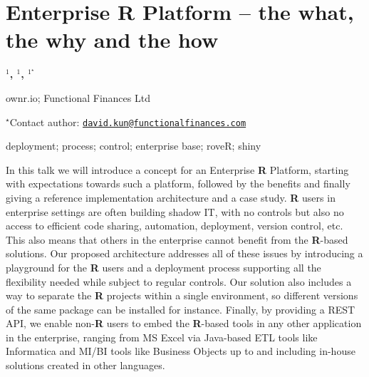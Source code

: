 \documentclass[\main/boa.tex]{subfiles}
\begin{document}
\section{Enterprise R Platform -- the what, the why and the how}

\begin{center}
  {\bf {}$^{1}$, $^{1}$, $^{1^\star}$}
\end{center}

\vskip 0.3cm

\begin{affiliations}
\begin{enumerate}
\begin{minipage}{0.915\textwidth}
\centering
\item ownr.io; Functional Finances Ltd \\[-2pt]
\end{minipage}
\end{enumerate}
$^\star$Contact author: \href{mailto:david.kun@functionalfinances.com}{\nolinkurl{david.kun@functionalfinances.com}}\\
\end{affiliations}

\vskip 0.5cm

\begin{minipage}{0.915\textwidth}
\keywords deployment; process; control; enterprise
\packages base; roveR; shiny
\end{minipage}

\vskip 0.8cm

In this talk we will introduce a concept for an Enterprise \textbf{R}
Platform, starting with expectations towards such a platform, followed
by the benefits and finally giving a reference implementation
architecture and a case study. \textbf{R} users in enterprise settings
are often building shadow IT, with no controls but also no access to
efficient code sharing, automation, deployment, version control, etc.
This also means that others in the enterprise cannot benefit from the
\textbf{R}-based solutions. Our proposed architecture addresses all of
these issues by introducing a playground for the \textbf{R} users and a
deployment process supporting all the flexibility needed while subject
to regular controls. Our solution also includes a way to separate the
\textbf{R} projects within a single environment, so different versions
of the same package can be installed for instance. Finally, by providing
a REST API, we enable non-\textbf{R} users to embed the \textbf{R}-based
tools in any other application in the enterprise, ranging from MS Excel
via Java-based ETL tools like Informatica and MI/BI tools like Business
Objects up to and including in-house solutions created in other
languages.
\end{document}
